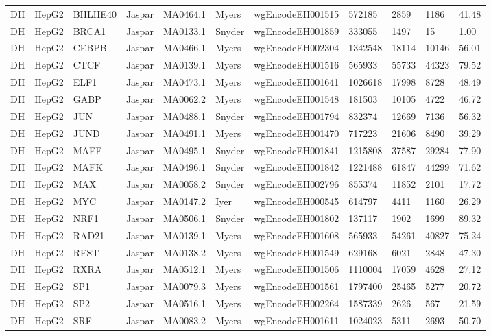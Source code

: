 {\begin{longtable}{p{0.2cm}p{1.1cm}p{1.0cm}p{1.0cm}p{1.0cm}p{1.0cm}p{2.3cm}p{1.0cm}p{0.8cm}p{0.8cm}p{0.8cm}}
DH & HepG2 & BHLHE40 & Jaspar & MA0464.1 & Myers & wgEncodeEH001515 & 572185 & 2859 & 1186 & 41.48\\
DH & HepG2 & BRCA1 & Jaspar & MA0133.1 & Snyder & wgEncodeEH001859 & 333055 & 1497 & 15 & 1.00\\
DH & HepG2 & CEBPB & Jaspar & MA0466.1 & Myers & wgEncodeEH002304 & 1342548 & 18114 & 10146 & 56.01\\
DH & HepG2 & CTCF & Jaspar & MA0139.1 & Myers & wgEncodeEH001516 & 565933 & 55733 & 44323 & 79.52\\
DH & HepG2 & ELF1 & Jaspar & MA0473.1 & Myers & wgEncodeEH001641 & 1026618 & 17998 & 8728 & 48.49\\
DH & HepG2 & GABP & Jaspar & MA0062.2 & Myers & wgEncodeEH001548 & 181503 & 10105 & 4722 & 46.72\\
DH & HepG2 & JUN & Jaspar & MA0488.1 & Snyder & wgEncodeEH001794 & 832374 & 12669 & 7136 & 56.32\\
DH & HepG2 & JUND & Jaspar & MA0491.1 & Myers & wgEncodeEH001470 & 717223 & 21606 & 8490 & 39.29\\
DH & HepG2 & MAFF & Jaspar & MA0495.1 & Snyder & wgEncodeEH001841 & 1215808 & 37587 & 29284 & 77.90\\
DH & HepG2 & MAFK & Jaspar & MA0496.1 & Snyder & wgEncodeEH001842 & 1221488 & 61847 & 44299 & 71.62\\
DH & HepG2 & MAX & Jaspar & MA0058.2 & Snyder & wgEncodeEH002796 & 855374 & 11852 & 2101 & 17.72\\
DH & HepG2 & MYC & Jaspar & MA0147.2 & Iyer & wgEncodeEH000545 & 614797 & 4411 & 1160 & 26.29\\
DH & HepG2 & NRF1 & Jaspar & MA0506.1 & Snyder & wgEncodeEH001802 & 137117 & 1902 & 1699 & 89.32\\
DH & HepG2 & RAD21 & Jaspar & MA0139.1 & Myers & wgEncodeEH001608 & 565933 & 54261 & 40827 & 75.24\\
DH & HepG2 & REST & Jaspar & MA0138.2 & Myers & wgEncodeEH001549 & 629168 & 6021 & 2848 & 47.30\\
DH & HepG2 & RXRA & Jaspar & MA0512.1 & Myers & wgEncodeEH001506 & 1110004 & 17059 & 4628 & 27.12\\
DH & HepG2 & SP1 & Jaspar & MA0079.3 & Myers & wgEncodeEH001561 & 1797400 & 25465 & 5277 & 20.72\\
DH & HepG2 & SP2 & Jaspar & MA0516.1 & Myers & wgEncodeEH002264 & 1587339 & 2626 & 567 & 21.59\\
DH & HepG2 & SRF & Jaspar & MA0083.2 & Myers & wgEncodeEH001611 & 1024023 & 5311 & 2693 & 50.70\\

\end{longtable}}
